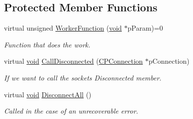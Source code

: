 \subsection*{\-Protected \-Member \-Functions}
\begin{DoxyCompactItemize}
\item 
virtual unsigned \hyperlink{class_c_p_handler_a86df3a9d167e20ae405eec33e384bd9b}{\-Worker\-Function} (\hyperlink{_cpclient_8h_a6464f7480a0fd0ee170cba12b2c0497f}{void} $\ast$p\-Param)=0
\begin{DoxyCompactList}\small\item\em \-Function that does the work. \end{DoxyCompactList}\item 
virtual \hyperlink{_cpclient_8h_a6464f7480a0fd0ee170cba12b2c0497f}{void} \hyperlink{class_c_p_handler_a439e2cfd01babb8ba9464a4300e90efe}{\-Call\-Disconnected} (\hyperlink{class_c_p_connection}{\-C\-P\-Connection} $\ast$p\-Connection)
\begin{DoxyCompactList}\small\item\em \-If we want to call the sockets \-Disconnected member. \end{DoxyCompactList}\item 
virtual \hyperlink{_cpclient_8h_a6464f7480a0fd0ee170cba12b2c0497f}{void} \hyperlink{class_c_p_handler_aaa931abc001648da48c2ff82e7071c50}{\-Disconnect\-All} ()
\begin{DoxyCompactList}\small\item\em \-Called in the case of an unrecoverable error. \end{DoxyCompactList}\end{DoxyCompactItemize}
